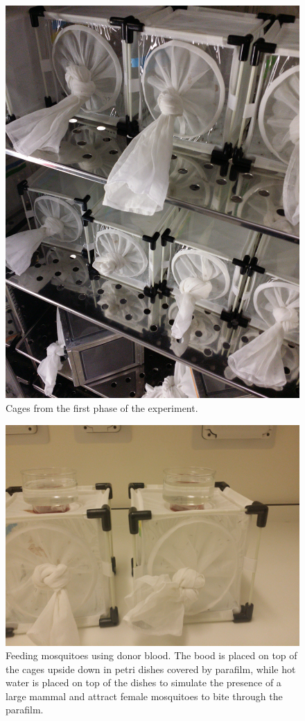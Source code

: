 \documentclass{article}
\begin{document}
\begin{figure}[p]
\includegraphics[scale=0.1, angle=270]{allcages}
\caption{Cages from the first phase of the experiment.}
\end{figure}

\begin{figure}[p]
\includegraphics[scale=0.1, angle=0]{feedingsetup}
\caption{Feeding mosquitoes using donor blood. The bood is placed on top of the cages upside down in petri dishes covered by parafilm, while hot water is placed on top of the dishes to simulate the presence of a large mammal and attract female mosquitoes to bite through the parafilm.}
\end{figure}
\end{document}
